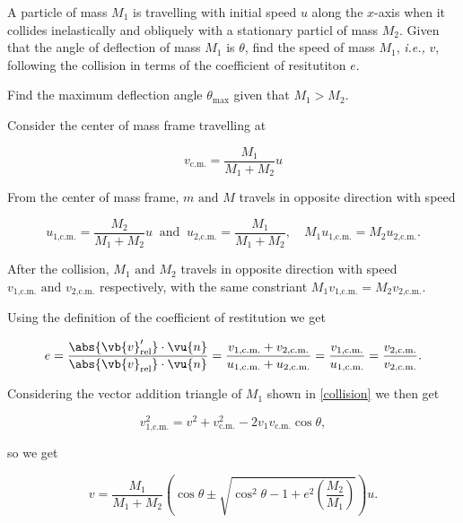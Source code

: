 \documentclass[a4paper,12pt]{report}
\begin{document}
{A particle of mass \(M_1 \) is travelling with initial speed \(u\) along the \(x\)-axis when it collides inelastically and obliquely with a stationary particl of mass \(M_2 \). Given that the angle of deflection of mass \(M_1 \) is \(\theta\), find the speed of mass \(M_1 \), \textit{i.e.,} \(v\), following the collision in terms of the coefficient of resitutiton \(e\).

Find the maximum deflection angle \(\theta _{\text{max} } \) given that \(M_1 > M_2 \).  }
{Consider the center of mass frame travelling at 

\begin{equation}
	v_{\text{c.m.} } = \frac{M_1 }{M_1 + M_2 }u  
\end{equation}

From the center of mass frame, \(m \text { and } M\) travels in opposite direction with speed 

\begin{equation}
	u_{\text{1,c.m.} } = \frac{M_2 }{M_1 + M_2 } u ~\text { and }~ u_{\text{2,c.m.} } = \frac{M_1 }{M_1 + M_2 }, \quad M_1 u_{\text{1,c.m.} } = M_2 u_{\text{2,c.m.} }.  
\end{equation}

After the collision, \(M_1  \text { and } M_2 \) travels in opposite direction with speed \(v_{\text{1,c.m.} } \text { and } v_{\text{2,c.m.} }  \) respectively, with the same constriant \(M_1 v_{\text{1,c.m.} }  = M_2 v_{\text{2,c.m.} } \).  

Using the definition of the coefficient of restitution we get 

\begin{equation}
	e = \frac{\abs{\vb{v} _{\text{rel} } '} \cdot \vu{n} }{\abs{\vb{v} _{\text{rel} } } \cdot \vu{n} } = \frac{v_{\text{1,c.m.} } + v_{\text{2,c.m.} }  }{u_{\text{1,c.m.} } + u_{\text{2,c.m.} } } = \frac{v_{\text{1,c.m.} } }{u_{\text{1,c.m.} } } = \frac{v_{\text{2,c.m.} } }{v_{\text{2,c.m.} } }.    
\end{equation}

Considering the vector addition triangle of \(M_1 \) shown in \cref{collision} we then get 

\begin{equation}
	v_{\text{1,c.m.} }^2 = v ^2 + v_{\text{c.m.} }^2 - 2v_1 v_{\text{c.m.} } \cos \theta , 
\end{equation}

so we get 

\begin{equation}
	v = \frac{M_1 }{M_1 + M_2 } \left( \cos \theta \pm \sqrt{\cos ^2\theta - 1 + e^2 \left( \frac{M_2 }{M_1 }  \right)}  \right) u.
\end{equation}


}
\end{document}
